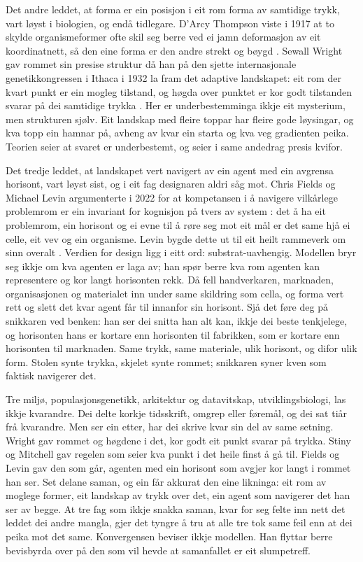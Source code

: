 Det andre leddet, at forma er ein posisjon i eit rom forma av samtidige trykk, vart løyst i biologien, og endå tidlegare. D'Arcy Thompson viste i 1917 at to skylde organismeformer ofte skil seg berre ved ei jamn deformasjon av eit koordinatnett, så den eine forma er den andre strekt og bøygd \autocite{thompson1917growth}. Sewall Wright gav rommet sin presise struktur då han på den sjette internasjonale genetikkongressen i Ithaca i 1932 la fram det adaptive landskapet: eit rom der kvart punkt er ein mogleg tilstand, og høgda over punktet er kor godt tilstanden svarar på dei samtidige trykka \autocite{wright1932}. Her er underbestemminga ikkje eit mysterium, men strukturen sjølv. Eit landskap med fleire toppar har fleire gode løysingar, og kva topp ein hamnar på, avheng av kvar ein starta og kva veg gradienten peika. Teorien seier at svaret er underbestemt, og seier i same andedrag presis kvifor.

Det tredje leddet, at landskapet vert navigert av ein agent med ein avgrensa horisont, vart løyst sist, og i eit fag designaren aldri såg mot. Chris Fields og Michael Levin argumenterte i 2022 for at kompetansen i å navigere vilkårlege problemrom er ein invariant for kognisjon på tvers av system \autocite{fields2022}: det å ha eit problemrom, ein horisont og ei evne til å røre seg mot eit mål er det same hjå ei celle, eit vev og ein organisme. Levin bygde dette ut til eit heilt rammeverk om sinn overalt \autocite{levin2022}. Verdien for design ligg i eitt ord: substrat-uavhengig. Modellen bryr seg ikkje om kva agenten er laga av; han spør berre kva rom agenten kan representere og kor langt horisonten rekk. Då fell handverkaren, marknaden, organisasjonen og materialet inn under same skildring som cella, og forma vert rett og slett det kvar agent får til innanfor sin horisont. Sjå det føre deg på snikkaren ved benken: han ser dei snitta han alt kan, ikkje dei beste tenkjelege, og horisonten hans er kortare enn horisonten til fabrikken, som er kortare enn horisonten til marknaden. Same trykk, same materiale, ulik horisont, og difor ulik form. Stolen synte trykka, skjelet synte rommet; snikkaren syner kven som faktisk navigerer det.

Tre miljø, populasjonsgenetikk, arkitektur og datavitskap, utviklingsbiologi, las ikkje kvarandre. Dei delte korkje tidsskrift, omgrep eller føremål, og dei sat tiår frå kvarandre. Men ser ein etter, har dei skrive kvar sin del av same setning. Wright gav rommet og høgdene i det, kor godt eit punkt svarar på trykka. Stiny og Mitchell gav regelen som seier kva punkt i det heile finst å gå til. Fields og Levin gav den som går, agenten med ein horisont som avgjer kor langt i rommet han ser. Set delane saman, og ein får akkurat den eine likninga: eit rom av moglege former, eit landskap av trykk over det, ein agent som navigerer det han ser av begge. At tre fag som ikkje snakka saman, kvar for seg felte inn nett det leddet dei andre mangla, gjer det tyngre å tru at alle tre tok same feil enn at dei peika mot det same. Konvergensen beviser ikkje modellen. Han flyttar berre bevisbyrda over på den som vil hevde at samanfallet er eit slumpetreff.

